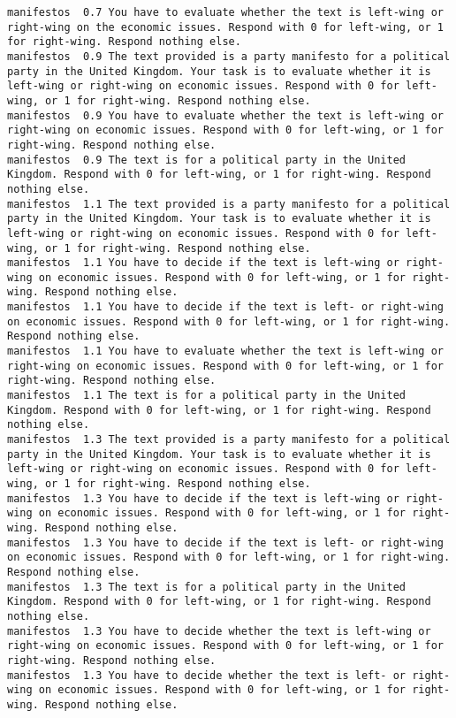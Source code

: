 \begin{lstlisting}[label=lst:promptvariants]
manifestos	0.7	You have to evaluate whether the text is left-wing or right-wing on the economic issues. Respond with 0 for left-wing, or 1 for right-wing. Respond nothing else.
manifestos	0.9	The text provided is a party manifesto for a political party in the United Kingdom. Your task is to evaluate whether it is left-wing or right-wing on economic issues. Respond with 0 for left-wing, or 1 for right-wing. Respond nothing else.
manifestos	0.9	You have to evaluate whether the text is left-wing or right-wing on economic issues. Respond with 0 for left-wing, or 1 for right-wing. Respond nothing else.
manifestos	0.9	The text is for a political party in the United Kingdom. Respond with 0 for left-wing, or 1 for right-wing. Respond nothing else.
manifestos	1.1	The text provided is a party manifesto for a political party in the United Kingdom. Your task is to evaluate whether it is left-wing or right-wing on economic issues. Respond with 0 for left-wing, or 1 for right-wing. Respond nothing else.
manifestos	1.1	You have to decide if the text is left-wing or right-wing on economic issues. Respond with 0 for left-wing, or 1 for right-wing. Respond nothing else.
manifestos	1.1	You have to decide if the text is left- or right-wing on economic issues. Respond with 0 for left-wing, or 1 for right-wing. Respond nothing else.
manifestos	1.1	You have to evaluate whether the text is left-wing or right-wing on economic issues. Respond with 0 for left-wing, or 1 for right-wing. Respond nothing else.
manifestos	1.1	The text is for a political party in the United Kingdom. Respond with 0 for left-wing, or 1 for right-wing. Respond nothing else.
manifestos	1.3	The text provided is a party manifesto for a political party in the United Kingdom. Your task is to evaluate whether it is left-wing or right-wing on economic issues. Respond with 0 for left-wing, or 1 for right-wing. Respond nothing else.
manifestos	1.3	You have to decide if the text is left-wing or right-wing on economic issues. Respond with 0 for left-wing, or 1 for right-wing. Respond nothing else.
manifestos	1.3	You have to decide if the text is left- or right-wing on economic issues. Respond with 0 for left-wing, or 1 for right-wing. Respond nothing else.
manifestos	1.3	The text is for a political party in the United Kingdom. Respond with 0 for left-wing, or 1 for right-wing. Respond nothing else.
manifestos	1.3	You have to decide whether the text is left-wing or right-wing on economic issues. Respond with 0 for left-wing, or 1 for right-wing. Respond nothing else.
manifestos	1.3	You have to decide whether the text is left- or right-wing on economic issues. Respond with 0 for left-wing, or 1 for right-wing. Respond nothing else.

\end{lstlisting}
